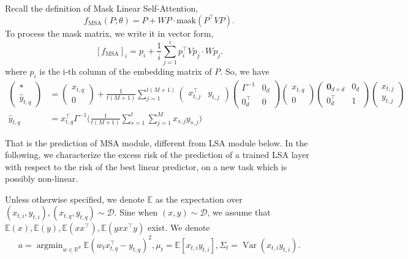\documentclass{article}
\theoremstyle{plain}
\theoremstyle{definition}
\theoremstyle{remark}
\begin{document}
Recall the definition of Mask Linear Self-Attention,
\[
f_{\mathrm{MSA}}(P;\theta)
= P + WP\cdot
\mathrm{mask}\!\left(P^\top VP\right).
\]
To process the mask matrix, we write it in vector form,
\[
[f_{\mathrm{MSA}}]_i = p_i + \frac{1}{i}\sum_{j=1}^i p_i^\top Vp_j\cdot Wp_j.
\]
where $p_i$ is the i-th column of the embedding matrix of $P$. So, we have
\begin{align*}
   \begin{pmatrix}
    * \\ \hat{y}_{t,q}
\end{pmatrix} &= \begin{pmatrix}
    x_{t,q} \\0
\end{pmatrix} + \frac{1}{t(M+1)}\sum_{j=1}^{t(M+1)}\begin{pmatrix}
    x_{t,j}^\top & y_{t,j}
\end{pmatrix}\begin{pmatrix}
  \Gamma^{-1}&0_d \\
  0^\top_d&0
\end{pmatrix}\begin{pmatrix}
    x_{t,q} \\ 0
\end{pmatrix}\begin{pmatrix}
    \textbf{0}_{d\times d} & 0_d \\ 0_d^\top & 1
\end{pmatrix}\begin{pmatrix}
    x_{t,j}\\y_{t,j}
\end{pmatrix} \\
\hat{y}_{t,q} &= x_{t,q}^\top\Gamma^{-1}
\Big(\frac{1}{t(M+1)}\sum_{s=1}^t \sum_{j=1}^M x_{s,j}y_{s,j}\Big)
\end{align*}

That is the prediction of MSA module, different from LSA module below. In the following, we characterize the excess risk of the prediction of a trained LSA layer with respect to the risk of the best linear predictor, on a new task which is possibly non-linear.

Unless otherwise specified, we denote $\mathbb{E}$ as the expectation over $(x_{t,i},y_{t,i}),(x_{t,q},y_{t,q})\sim \mathcal{D}$. Sine when $(x,y)\sim \mathcal{D}$, we assume that $\mathbb{E}(x),\mathbb{E}(y),\mathbb{E}(xx^\top),\mathbb{E}(yxx^\top y)$ exist. We denote \[
a = \operatorname{arg min}_{w\in \mathbb{R}^d}\mathbb{E}(w_tx_{t,q}^\top-y_{t,q})^2,\mu_t=\mathbb E[x_{t,i}y_{t,i}],
\Sigma_t=\operatorname{Var}(x_{t,i}y_{t,i}).
\]
\end{document}
